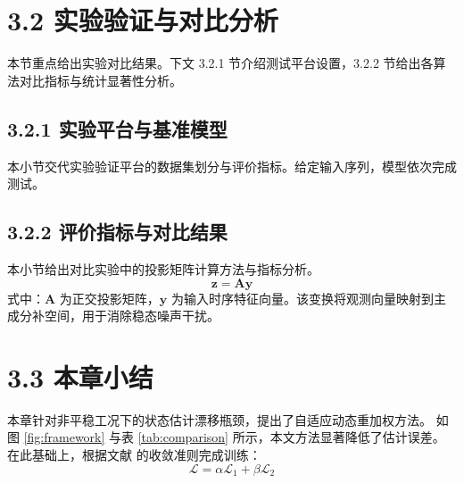 \documentclass{ctexbook}
\begin{document}
\section{3.2 实验验证与对比分析}
本节重点给出实验对比结果。下文 3.2.1 节介绍测试平台设置，3.2.2 节给出各算法对比指标与统计显著性分析。

\subsection{3.2.1 实验平台与基准模型}
本小节交代实验验证平台的数据集划分与评价指标。给定输入序列，模型依次完成测试。

\subsection{3.2.2 评价指标与对比结果}
本小节给出对比实验中的投影矩阵计算方法与指标分析。
\begin{equation}
\mathbf{z} = \mathbf{A} \mathbf{y}
\end{equation}
式中：$\mathbf{A}$ 为正交投影矩阵，$\mathbf{y}$ 为输入时序特征向量。该变换将观测向量映射到主成分补空间，用于消除稳态噪声干扰。

\section{3.3 本章小结}
本章针对非平稳工况下的状态估计漂移瓶颈，提出了自适应动态重加权方法。
如图 \ref{fig:framework} 与表 \ref{tab:comparison} 所示，本文方法显著降低了估计误差。
在此基础上，根据文献 \cite{smith2024} 的收敛准则完成训练：
\begin{equation}
\mathcal{L} = \alpha \mathcal{L}_1 + \beta \mathcal{L}_2
\end{equation}
\end{document}
